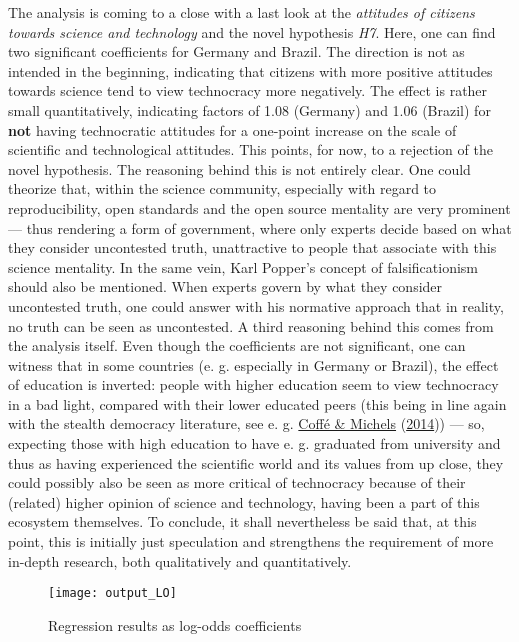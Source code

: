 \documentclass[
  12pt,
  english,
]{article}
\begin{document}
The analysis is coming to a close with a last look at the
\emph{attitudes of citizens towards science and technology} and the
novel hypothesis \emph{H7}. Here, one can find two significant
coefficients for Germany and Brazil. The direction is not as intended in
the beginning, indicating that citizens with more positive attitudes
towards science tend to view technocracy more negatively. The effect is
rather small quantitatively, indicating factors of 1.08 (Germany) and
1.06 (Brazil) for \textbf{not} having technocratic attitudes for a
one-point increase on the scale of scientific and technological
attitudes. This points, for now, to a rejection of the novel hypothesis.
The reasoning behind this is not entirely clear. One could theorize
that, within the science community, especially with regard to
reproducibility, open standards and the open source mentality are very
prominent --- thus rendering a form of government, where only experts
decide based on what they consider uncontested truth, unattractive to
people that associate with this science mentality. In the same vein,
Karl Popper's concept of falsificationism should also be mentioned. When
experts govern by what they consider uncontested truth, one could answer
with his normative approach that in reality, no truth can be seen as
uncontested. A third reasoning behind this comes from the analysis
itself. Even though the coefficients are not significant, one can
witness that in some countries (e. g. especially in Germany or Brazil),
the effect of education is inverted: people with higher education seem
to view technocracy in a bad light, compared with their lower educated
peers (this being in line again with the stealth democracy literature,
see e. g. \protect\hyperlink{ref-coffe2014education}{Coffé \& Michels}
(\protect\hyperlink{ref-coffe2014education}{2014})) --- so, expecting
those with high education to have e. g. graduated from university and
thus as having experienced the scientific world and its values from up
close, they could possibly also be seen as more critical of technocracy
because of their (related) higher opinion of science and technology,
having been a part of this ecosystem themselves. To conclude, it shall
nevertheless be said that, at this point, this is initially just
speculation and strengthens the requirement of more in-depth research,
both qualitatively and quantitatively.

\begin{figure}

{\centering \texttt{[image: output\_LO]} 

}

\caption{Regression results as log-odds coefficients}\label{fig:insert graphics: LO table}
\end{figure}
\end{document}
